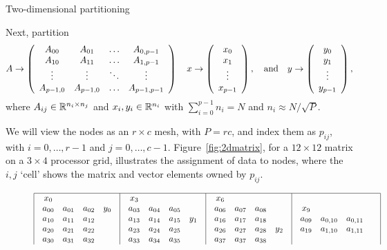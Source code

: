  {Two-dimensional partitioning}
\label{sec:mvp-2d}

Next,
partition
\[
A \rightarrow \left( \begin{array}{c c c c} A_{00} & A_{01} & \ldots & A_{0,p-1} \\ A_{10} & A_{11} & \ldots & A_{1,p-1} \\ \vdots & \vdots & \ddots & \vdots \\ A_{p-1,0} & A_{p-1,0} & \ldots & A_{p-1,p-1} \\ \end{array} \right)
\quad
x \rightarrow \left( \begin{array}{c} x_0 \\ x_1 \\ \vdots \\ x_{p-1} \end{array} \right) ,
\quad
\mbox{and}
\quad
y \rightarrow \left( \begin{array}{c} y_0 \\ y_1 \\ \vdots \\ y_{p-1} \end{array} \right) ,
\]
where $ A_{ij} \in \mathbb{R}^{n_i \times n_j} $ and $ x_i, y_i \in \mathbb{R}^{n_i} $ with
$ \sum_{i=0}^{p-1} n_i = N $ and $ n_i \approx N / \sqrt P $.

We will view the nodes as an $ r \times c $ mesh, with $ P = r c $,
and index them as $p_{ij}$, 
%
with $ i=0, \ldots, r-1 $ and $ j = 0,\ldots, c-1 $.
%
Figure~\ref{fig:2dmatrix}, for a $12\times12$ matrix
on a $3\times4$ processor grid,
illustrates the assignment of data to nodes, where the $ i,j$
`cell' shows the matrix and vector elements owned by  $ p_{ij} $.

\begin{figure}[ht]
{\footnotesize
\[
\begin{array}{| c | c | c | c |} \hline
\begin{array}{c c c c}
x_0\\
a_{00} & a_{01} &a_{02} & y_0\\
a_{10} & a_{11} &a_{12} & \\
a_{20} & a_{21} &a_{22} & \\
a_{30} & a_{31} &a_{32} & \\
\end{array}
&
\begin{array}{c c c c}
x_3\\
a_{03} & a_{04} &a_{05} & \\
a_{13} & a_{14} &a_{15} & y_1\\
a_{23} & a_{24} &a_{25} & \\
a_{33} & a_{34} &a_{35} & \\
\end{array}
&
\begin{array}{c c c c}
x_6\\
a_{06} & a_{07} &a_{08} & \\
a_{16} & a_{17} &a_{18} & \\
a_{26} & a_{27} &a_{28} & y_2 \\
a_{37} & a_{37} &a_{38} & \\
\end{array}
&
\begin{array}{c c c c}
x_9\\
a_{09} & a_{0,10} & a_{0,11} & \\
a_{19} & a_{1,10} & a_{1,11} & \\

\end{array}
\end{array}\]}
\end{figure}
